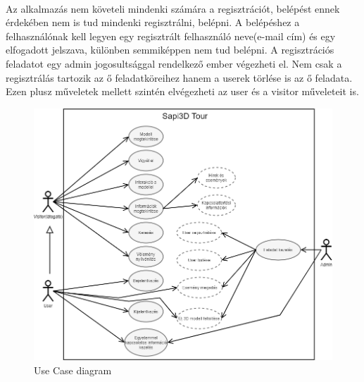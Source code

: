 	\paragraph{}
	Az alkalmazás nem követeli mindenki számára a regisztrációt, belépést ennek érdekében nem is tud mindenki regisztrálni, belépni. A belépéshez a felhasználónak kell legyen egy regisztrált felhasználó neve(e-mail cím) és egy elfogadott jelszava, különben semmiképpen nem tud belépni. A regisztrációs feladatot egy admin jogosultsággal rendelkező ember végezheti el. Nem csak a regisztrálás tartozik az ő feladatköreihez hanem a userek törlése is az ő feladata. Ezen plusz műveletek mellett szintén elvégezheti az user és a visitor műveleteit is.
	\begin{figure}
		\centering
		\includegraphics[scale=0.6]{figures/images/UseCase.png}
		\caption{Use Case diagram}
		\label{fig:UseCase}
	\end{figure}
\pagebreak